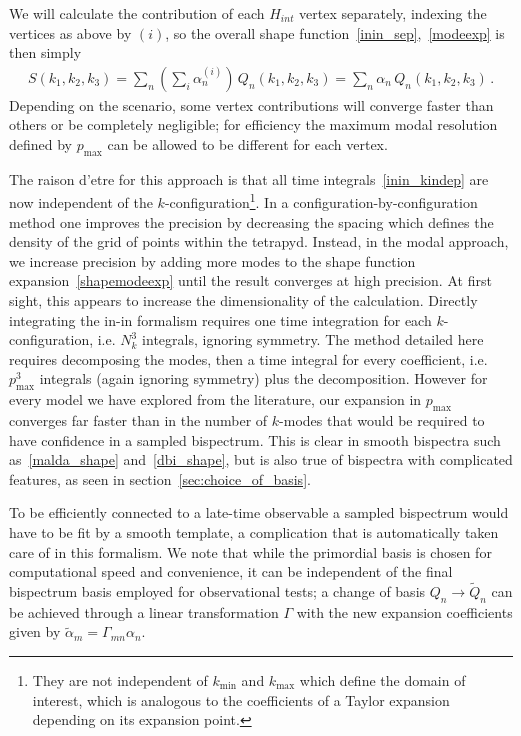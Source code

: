 \documentclass[a4paper,12pt]{extarticle}
\newcommand{\Pmax}{p_\text{max}}
\newcommand{\Hint}{H_{int}}
\newcommand{\kmin}{{k_\text{min}}}
\newcommand{\kmax}{{k_\text{max}}}
\begin{document}
We will calculate the contribution of each $\Hint$ vertex separately,
indexing the vertices as above by $(i)$, so the overall shape function~\eqref{inin_sep},~\eqref{modeexp} is then simply
\begin{eqnarray}\label{shapemodeexp}
    S(k_1, k_2,k_3) =   \sum_n \left(\sum_i \alpha_n^{(i)}\right) \, Q_n(k_1,k_2,k_3) =  \sum_n \alpha_n \, Q_n(k_1,k_2,k_3) \,.
\end{eqnarray}
Depending on the scenario,  some vertex contributions will converge faster than others 
or be completely negligible;
for efficiency the maximum modal resolution defined by $\Pmax$ can be allowed to be different
for each vertex.  
 

The raison d'etre for this approach is that all time integrals~\eqref{inin_kindep} are now independent of the $k$-configuration\footnote{
    They are not independent of $\kmin$ and $\kmax$ which define the domain of interest,
    which is analogous to the coefficients of a Taylor expansion depending on its expansion point.
}.
In a configuration-by-configuration method one improves the precision by
decreasing the spacing which defines the density of the grid of points within the tetrapyd.
Instead, in the modal approach, we increase precision by adding more modes to the shape function expansion~\eqref{shapemodeexp}
until the result converges at high precision.   At first sight, this appears to increase the dimensionality of the calculation.
Directly integrating the in-in formalism requires one time
integration for each $k$-configuration, i.e. $N_k^3$ integrals, ignoring symmetry.
The method detailed here requires decomposing the modes,
then a time integral for every coefficient, i.e. $\Pmax^3$ integrals
(again ignoring symmetry) plus the decomposition.
However for every model we have explored from the literature,
our expansion in $\Pmax$ converges far faster than in the number of
$k$-modes that would be required to have confidence in a sampled bispectrum.
This is clear in smooth bispectra such as~\eqref{malda_shape} and~\eqref{dbi_shape},
but is also true of bispectra with complicated features,
as seen in section~\ref{sec:choice_of_basis}.

To be efficiently connected to a late-time observable
a sampled bispectrum would have to be fit by a smooth template,
a complication that is automatically taken care of in this formalism.
We note that while the primordial basis is chosen for computational speed and convenience, it can be 
independent of the final bispectrum basis employed for observational tests; a change of basis $Q_n\rightarrow \tilde Q_n$ can be achieved through a linear transformation $\Gamma$ with the new expansion coefficients given by $\tilde \alpha_m = \Gamma_{mn}\alpha_n$. 
\end{document}
